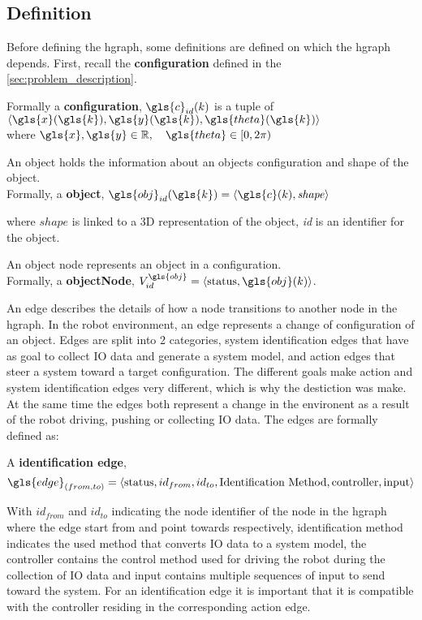 \subsection{Definition}%
\label{subsec:hgraph_definition}%
Before defining the \ac{hgraph}, some definitions are defined on which the \ac{hgraph} depends. First, recall the \textbf{configuration} defined in the \cref{sec:problem_description}.\bs

Formally a \textbf{configuration}, $\gls{c}_{id}(k)$ is a tuple of $\left\langle \gls{x}(\gls{k}), \gls{y}(\gls{k}), \gls{theta}(\gls{k})\right\rangle$\\ where $\gls{x}, \gls{y} \in \mathbb{R}, \quad  \gls{theta} \in [0, 2\pi)$\bs

An object holds the information about an objects configuration and shape of the object.\\Formally, a \textbf{object},  $\gls{obj}_{id}(\gls{k}) = \left\langle \gls{c}(k), \mathit{shape} \right\rangle $\bs

where $\mathit{shape}$ is linked to a 3D representation of the object, \textit{id} is an identifier for the object.\bs

An object node represents an object in a configuration.\\Formally, a \textbf{objectNode}, $V^{\gls{obj}}_{id} =\left\langle \textrm{status}, \gls{obj}(k)\right\rangle $.\bs

An edge describes the details of how a node transitions to another node in the \ac{hgraph}. In the robot environment, an edge represents a change of configuration of an object. Edges are split into 2 categories, system identification edges that have as goal to collect \ac{IO} data and generate a system model, and action edges that steer a system toward a target configuration. The different goals make action and system identification edges very different, which is why the destiction was make. At the same time the edges both represent a change in the environent as a result of the robot driving, pushing or collecting \ac{IO} data. The edges are formally defined as:\bs

A \textbf{identification edge}, \[\gls{edge}_{(from, to)} = \left\langle \textrm{status}, id_{from}, id_{to}, \textrm{Identification Method}, \textrm{controller}, \textrm{input}\right\rangle\]\bs

With $id_{from}$ and $id_{to}$ indicating the node identifier of the node in the \ac{hgraph} where the edge start from and point towards respectively, identification method indicates the used method that converts \ac{IO} data to a system model, the controller contains the control method used for driving the robot during the collection of \ac{IO} data and input contains multiple sequences of input to send toward the system. For an identification edge it is important that it is compatible with the controller residing in the corresponding action edge.\bs

